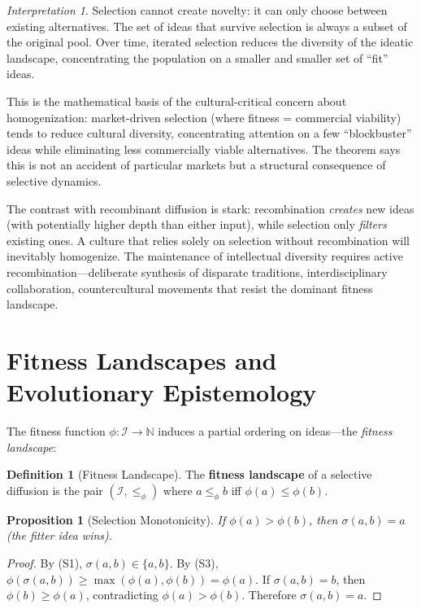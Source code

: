 \documentclass[11pt,openany]{book}
\theoremstyle{definition}
\newtheorem{definition}[axiom]{Definition}
\theoremstyle{plain}
\newtheorem{proposition}[axiom]{Proposition}
\theoremstyle{remark}
\newtheorem{interpretation}[axiom]{Interpretation}
\newcommand{\IS}{\mathcal{I}}               %
\begin{document}
\begin{interpretation}
Selection cannot create novelty: it can only choose between existing alternatives. The set of ideas that survive selection is always a subset of the original pool. Over time, iterated selection reduces the diversity of the ideatic landscape, concentrating the population on a smaller and smaller set of ``fit'' ideas.

This is the mathematical basis of the cultural-critical concern about homogenization: market-driven selection (where fitness = commercial viability) tends to reduce cultural diversity, concentrating attention on a few ``blockbuster'' ideas while eliminating less commercially viable alternatives. The theorem says this is not an accident of particular markets but a structural consequence of selective dynamics.

The contrast with recombinant diffusion is stark: recombination \emph{creates} new ideas (with potentially higher depth than either input), while selection only \emph{filters} existing ones. A culture that relies solely on selection without recombination will inevitably homogenize. The maintenance of intellectual diversity requires active recombination---deliberate synthesis of disparate traditions, interdisciplinary collaboration, countercultural movements that resist the dominant fitness landscape.
\end{interpretation}

\section{Fitness Landscapes and Evolutionary Epistemology}

The fitness function $\phi : \IS \to \mathbb{N}$ induces a partial ordering on ideas---the \emph{fitness landscape}:

\begin{definition}[Fitness Landscape]
The \textbf{fitness landscape} of a selective diffusion is the pair $(\IS, \leq_\phi)$ where $a \leq_\phi b$ iff $\phi(a) \leq \phi(b)$.
\end{definition}

\begin{proposition}[Selection Monotonicity]
If $\phi(a) > \phi(b)$, then $\sigma(a, b) = a$ (the fitter idea wins).
\end{proposition}

\begin{proof}
By (S1), $\sigma(a, b) \in \{a, b\}$. By (S3), $\phi(\sigma(a, b)) \geq \max(\phi(a), \phi(b)) = \phi(a)$. If $\sigma(a, b) = b$, then $\phi(b) \geq \phi(a)$, contradicting $\phi(a) > \phi(b)$. Therefore $\sigma(a, b) = a$.
\end{proof}
\end{document}
